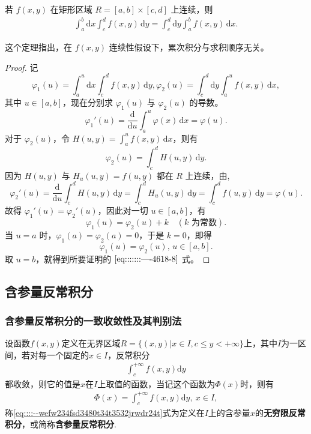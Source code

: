 \documentclass[../../main.tex]{subfiles}%
\begin{document}
\begin{theorem}
若 \( f(x,y) \) 在矩形区域 \( R = [a,b] \times [c,d] \) 上连续，则
\begin{align}
\int_{a}^{b} \mathrm{d}x \int_{c}^{d} f(x,y) \, \mathrm{d}y = \int_{c}^{d} \mathrm{d}y \int_{a}^{b} f(x,y) \, \mathrm{d}x. \label{eq:::::::----4618-8}
\end{align}
\end{theorem}
\begin{note}
这个定理指出，在 \( f(x,y) \) 连续性假设下，累次积分与求积顺序无关。
\end{note}
\begin{proof}
记
\[
\varphi_1(u) = \int_{a}^{u} \mathrm{d}x \int_{c}^{d} f(x,y) \, \mathrm{d}y,
\varphi_2(u) = \int_{c}^{d} \mathrm{d}y \int_{a}^{u} f(x,y) \, \mathrm{d}x,
\]
其中 \( u \in [a,b] \)，现在分别求 \( \varphi_1(u) \) 与 \( \varphi_2(u) \) 的导数。
\[
\varphi_1'(u) = \frac{\mathrm{d}}{\mathrm{d}u} \int_{a}^{u} \varphi(x) \, \mathrm{d}x = \varphi(u).
\]
对于 \( \varphi_2(u) \)，令 \( H(u,y) = \int_{a}^{u} f(x,y) \, \mathrm{d}x \)，则有
\[
\varphi_2(u) = \int_{c}^{d} H(u,y) \, \mathrm{d}y.
\]
因为 \( H(u,y) \) 与 \( H_u(u,y) = f(u,y) \) 都在 \( R \) 上连续，由,
\[
\varphi_2'(u) = \frac{\mathrm{d}}{\mathrm{d}u} \int_{c}^{d} H(u,y) \, \mathrm{d}y = \int_{c}^{d} H_u(u,y) \, \mathrm{d}y
= \int_{c}^{d} f(u,y) \, \mathrm{d}y = \varphi(u).
\]
故得 \( \varphi_1'(u) = \varphi_2'(u) \)，因此对一切 \( u \in [a,b] \)，有
\[
\varphi_1(u) = \varphi_2(u) + k \quad (k \text{ 为常数}).
\]
当 \( u = a \) 时，\( \varphi_1(a) = \varphi_2(a) = 0 \)，于是 \( k = 0 \)，即得
\[
\varphi_1(u) = \varphi_2(u), \, u \in [a,b].
\]
取 \( u = b \)，就得到所要证明的 \(\eqref{eq:::::::----4618-8}\) 式。
\end{proof}




\subsection{含参量反常积分}

\subsubsection{含参量反常积分的一致收敛性及其判别法}

\begin{definition}[含参量反常积分]
设函数$f(x,y)$定义在无界区域$R=\{(x,y)|x\in I,c\leqslant y<+\infty\}$上，其中$I$为一区间，若对每一个固定的$x\in I$，反常积分
\begin{align}
\int_{c}^{+\infty}f(x,y)\mathrm{d}y \label{eq::::--wefw234fsd3480t34t3532jrwdr24t}
\end{align}
都收敛，则它的值是$x$在$I$上取值的函数，当记这个函数为$\varPhi(x)$时，则有
\begin{align}
\varPhi(x)=\int_{c}^{+\infty}f(x,y)\mathrm{d}y,\ x\in I, \label{eq::::--wefw234fsd3480t34t32jrwdr24t}
\end{align}
称\eqref{eq::::--wefw234fsd3480t34t3532jrwdr24t}式为定义在$I$上的含参量$x$的\textbf{无穷限反常积分}，或简称\textbf{含参量反常积分}.
\end{definition}
\end{document}
